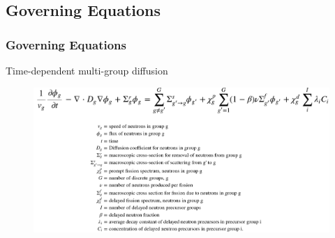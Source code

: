 %
%  
%

\subsection{Governing Equations}

\begin{frame}
  \frametitle{Governing Equations}
      \begin{block}{Time-dependent multi-group diffusion}
              \begin{figure}[t]
               \hspace*{-0.25in}
                \includegraphics[height=0.55\textwidth]{./images/diffusion.png}
               \end{figure}   
      \end{block}
\end{frame}

